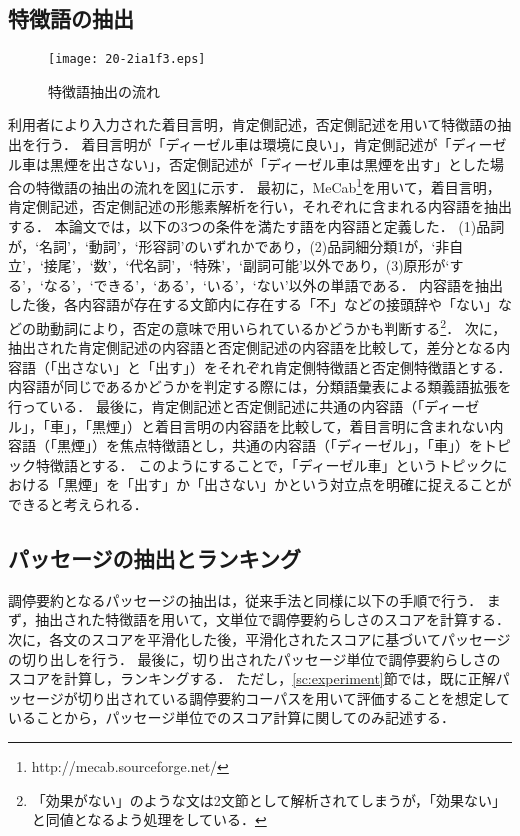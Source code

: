 \documentclass[japanese]{jnlp_1.4}
\begin{document}
\subsection{特徴語の抽出}
\label{ssc:keyword_extraction}

\begin{figure}[t]
\begin{center}
\texttt{[image: 20-2ia1f3.eps]}
\end{center}
\caption{特徴語抽出の流れ}
\label{fg:keyword}
\end{figure}

利用者により入力された着目言明，肯定側記述，否定側記述を用いて特徴語の抽出を行う．
着目言明が「ディーゼル車は環境に良い」，肯定側記述が「ディーゼル車は黒煙を出さない」，否定側記述が「ディーゼル車は黒煙を出す」とした場合の特徴語の抽出の流れを図\ref{fg:keyword}に示す．
最初に，MeCab\footnote{http://mecab.sourceforge.net/}を用いて，着目言明，肯定側記述，否定側記述の形態素解析を行い，それぞれに含まれる内容語を抽出する．
本論文では，以下の3つの条件を満たす語を内容語と定義した．
(1)品詞が，`名詞'，`動詞'，`形容詞'のいずれかであり，(2)品詞細分類1が，`非自立'，`接尾'，`数'，`代名詞'，`特殊'，`副詞可能'以外であり，(3)原形が`する'，`なる'，`できる'，`ある'，`いる'，`ない'以外の単語である．
内容語を抽出した後，各内容語が存在する文節内に存在する「不」などの接頭辞や「ない」などの助動詞により，否定の意味で用いられているかどうかも判断する\footnote{「効果がない」のような文は2文節として解析されてしまうが，「効果ない」と同値となるよう処理をしている．}．
次に，抽出された肯定側記述の内容語と否定側記述の内容語を比較して，差分となる内容語（「出さない」と「出す」）をそれぞれ肯定側特徴語と否定側特徴語とする．
内容語が同じであるかどうかを判定する際には，分類語彙表\cite{BunruiGoiHyou2004}による類義語拡張を行っている．
最後に，肯定側記述と否定側記述に共通の内容語（「ディーゼル」，「車」，「黒煙」）と着目言明の内容語を比較して，着目言明に含まれない内容語（「黒煙」）を焦点特徴語とし，共通の内容語（「ディーゼル」，「車」）をトピック特徴語とする．
このようにすることで，「ディーゼル車」というトピックにおける「黒煙」を「出す」か「出さない」かという対立点を明確に捉えることができると考えられる．


\subsection{パッセージの抽出とランキング}
\label{ssc:passage_extraction}

調停要約となるパッセージの抽出は，従来手法\cite{Shibuki2011a,Nakano2011,Shibuki2010}と同様に以下の手順で行う．
まず，抽出された特徴語を用いて，文単位で調停要約らしさのスコアを計算する．
次に，各文のスコアを平滑化した後，平滑化されたスコアに基づいてパッセージの切り出しを行う．
最後に，切り出されたパッセージ単位で調停要約らしさのスコアを計算し，ランキングする．
ただし，\ref{sc:experiment}節では，既に正解パッセージが切り出されている調停要約コーパスを用いて評価することを想定していることから，パッセージ単位でのスコア計算に関してのみ記述する．
\end{document}
